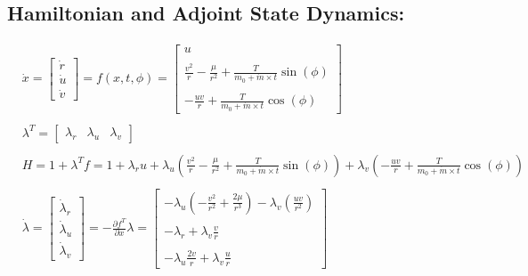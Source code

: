 \documentclass{article}
\begin{document}
	
	\subsection{Hamiltonian and Adjoint State Dynamics:}
	\begin{align*}
		& \dot{x}=\begin{bmatrix}
			\dot{r} \\
			\dot{u} \\
			\dot{v}
		\end{bmatrix}=f(x, t, \phi)=\begin{bmatrix}
			u \\ \\
			\frac{v^2}{r}-\frac{\mu}{r^2}+\frac{T}{m_0+\dot{m} \times t} \sin (\phi) \\ \\
			-\frac{u v}{r}+\frac{T}{m_0+\dot{m} \times t} \cos (\phi)
		\end{bmatrix} \\ \\
		& \lambda^T=\begin{bmatrix}
			\lambda_r & \lambda_u & \lambda_v
		\end{bmatrix} \\ \\
		& H=1+\lambda^T f=1+\lambda_r u+\lambda_u\left(\frac{v^2}{r}-\frac{\mu}{r^2}+\frac{T}{m_0+\dot{m} \times t} \sin (\phi)\right)+\lambda_v\left(-\frac{u v}{r}+\frac{T}{m_0+\dot{m} \times t} \cos (\phi)\right) \\ \\
		& \dot{\lambda}=\begin{bmatrix}
			\dot{\lambda}_r \\
			\dot{\lambda}_u \\
			\dot{\lambda}_v
		\end{bmatrix}=-\frac{\partial f^T}{\partial x} \lambda=\begin{bmatrix}
			-\lambda_u\left(-\frac{v^2}{r^2}+\frac{2 \mu}{r^3}\right)-\lambda_v\left(\frac{u v}{r^2}\right) \\ \\
			-\lambda_r+\lambda_v \frac{v}{r} \\ \\
			-\lambda_u \frac{2 v}{r}+\lambda_v \frac{u}{r}
		\end{bmatrix}
	\end{align*}
	
\end{document}

